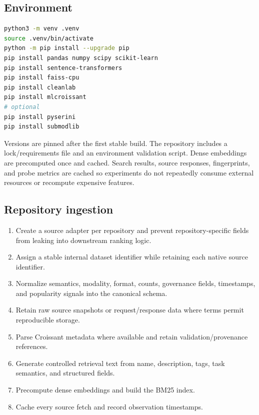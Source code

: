 \documentclass[11pt]{article}
\begin{document}
\subsection{Environment}
\begin{lstlisting}[language=bash]
python3 -m venv .venv
source .venv/bin/activate
python -m pip install --upgrade pip
pip install pandas numpy scipy scikit-learn
pip install sentence-transformers
pip install faiss-cpu
pip install cleanlab
pip install mlcroissant
# optional
pip install pyserini
pip install submodlib
\end{lstlisting}
Versions are pinned after the first stable build. The repository includes a lock/requirements file and an
environment validation script. Dense embeddings are precomputed once and cached. Search results, source
responses, fingerprints, and probe metrics are cached so experiments do not repeatedly consume external
resources or recompute expensive features.

\subsection{Repository ingestion}
\begin{enumerate}[leftmargin=*]
\item Create a source adapter per repository and prevent repository-specific fields from leaking into
      downstream ranking logic.
\item Assign a stable internal dataset identifier while retaining each native source identifier.
\item Normalize semantics, modality, format, counts, governance fields, timestamps, and popularity signals
      into the canonical schema.
\item Retain raw source snapshots or request/response data where terms permit reproducible storage.
\item Parse Croissant metadata where available and retain validation/provenance references.
\item Generate controlled retrieval text from name, description, tags, task semantics, and structured
      fields.
\item Precompute dense embeddings and build the BM25 index.
\item Cache every source fetch and record observation timestamps.
\end{enumerate}
\end{document}
